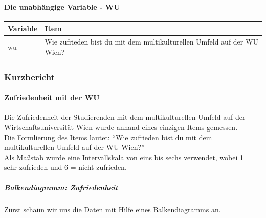 \documentclass[]{article}
\let\oldparagraph\paragraph
\renewcommand{\paragraph}[1]{\oldparagraph{#1}\mbox{}}
\let\oldsubparagraph\subparagraph
\renewcommand{\subparagraph}[1]{\oldsubparagraph{#1}\mbox{}}
\begin{document}
\paragraph{Die unabhängige Variable -
WU}\label{die-unabhangige-variable---wu}

\begin{longtable}[]{@{}ll@{}}
\toprule
\begin{minipage}[b]{0.09\columnwidth}\raggedright\strut
Variable\strut
\end{minipage} & \begin{minipage}[b]{0.85\columnwidth}\raggedright\strut
Item\strut
\end{minipage}\tabularnewline
\midrule
\endhead
\begin{minipage}[t]{0.09\columnwidth}\raggedright\strut
wu\strut
\end{minipage} & \begin{minipage}[t]{0.85\columnwidth}\raggedright\strut
Wie zufrieden bist du mit dem multikulturellen Umfeld auf der WU
Wien?\strut
\end{minipage}\tabularnewline
\bottomrule
\end{longtable}

\subsubsection{Kurzbericht}\label{kurzbericht-1}

\paragraph{Zufriedenheit mit der WU}\label{zufriedenheit-mit-der-wu}

Die Zufriedenheit der Studierenden mit dem multikulturellen Umfeld auf
der Wirtschaftsuniversität Wien wurde anhand eines einzigen Items
gemessen.\\
Die Formlierung des Items lautet: ``Wie zufrieden bist du mit dem
multikulturellen Umfeld auf der WU Wien?''\\
Als Maßstab wurde eine Intervallskala von eins bis sechs verwendet,
wobei 1 = sehr zufrieden und 6 = nicht zufrieden.

\subparagraph{Balkendiagramm:
Zufriedenheit}\label{balkendiagramm-zufriedenheit}

Zürst schaün wir uns die Daten mit Hilfe eines Balkendiagramms an.
\end{document}
